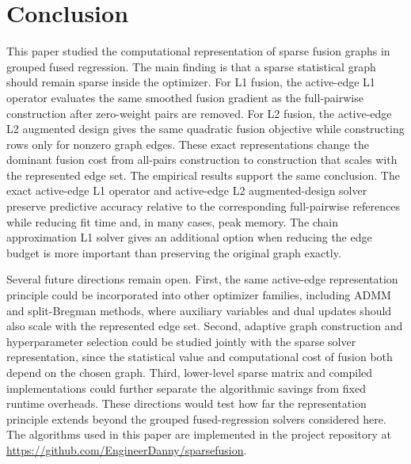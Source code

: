 \documentclass[twoside,11pt]{article}
\begin{document}
\section{Conclusion}
This paper studied the computational representation of sparse fusion graphs in grouped fused regression. 
The main finding is that a sparse statistical graph should remain sparse inside the optimizer. 
For L1 fusion, the active-edge L1 operator evaluates the same smoothed fusion gradient as the full-pairwise construction after zero-weight pairs are removed. 
For L2 fusion, the active-edge L2 augmented design gives the same quadratic fusion objective while constructing rows only for nonzero graph edges. 
These exact representations change the dominant fusion cost from all-pairs construction to construction that scales with the represented edge set.
The empirical results support the same conclusion. 
The exact active-edge L1 operator and active-edge L2 augmented-design solver preserve predictive accuracy relative to the corresponding full-pairwise references while reducing fit time and, in many cases, peak memory. 
The chain approximation L1 solver gives an additional option when reducing the edge budget is more important than preserving the original graph exactly. 

Several future directions remain open. 
First, the same active-edge representation principle could be incorporated into other optimizer families, including ADMM and split-Bregman methods, where auxiliary variables and dual updates should also scale with the represented edge set. 
Second, adaptive graph construction and hyperparameter selection could be studied jointly with the sparse solver representation, since the statistical value and computational cost of fusion both depend on the chosen graph. 
Third, lower-level sparse matrix and compiled implementations could further separate the algorithmic savings from fixed runtime overheads. 
These directions would test how far the representation principle extends beyond the grouped fused-regression solvers considered here.
The algorithms used in this paper are implemented in the project repository at \url{https://github.com/EngineerDanny/sparsefusion}.


\end{document}
